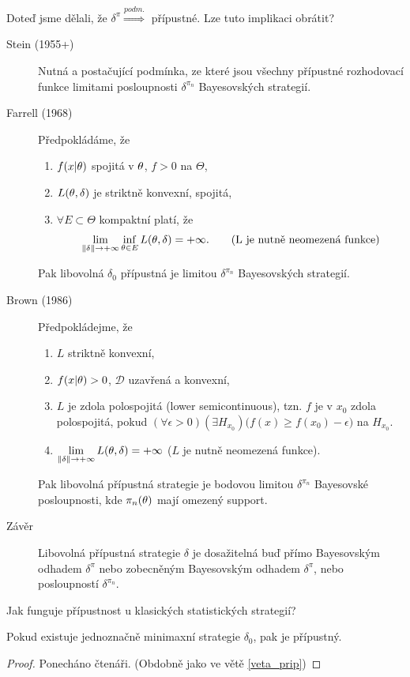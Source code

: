 \begin{remark}
	Doteď jsme dělali, že $\delta^{\pi}\overset{podm.}{\Rightarrow}$ přípustné. Lze tuto implikaci obrátit? 
	\begin{description}
		\item[Stein (1955+)] Nutná a postačující podmínka, ze které jsou všechny přípustné rozhodovací funkce limitami posloupnosti $\delta^{\pi_n}$ Bayesovských strategií.
		\item[Farrell (1968)] Předpokládáme, že \begin{enumerate}[1)]
			\item $f(x|\theta)$ spojitá v $\theta$, $f>0$ na $\Theta$,
			\item $L(\theta,\delta)$ je striktně konvexní, spojitá,
			\item $\forall E\subset\Theta$ kompaktní platí, že 
			$$ \lim\limits_{\left\|\delta\right\|\to+\infty}\inf\limits_{\theta\in E}L(\theta,\delta)=+\infty.\qquad(\text{L je nutně neomezená funkce})$$ 
		\end{enumerate}
	Pak libovolná $\delta_0$ přípustná je limitou $\delta^{\pi_n}$ Bayesovských strategií.
	\item[Brown (1986)] Předpokládejme, že \begin{enumerate}[1)]
		\item $L$ striktně konvexní,
		\item $f(x|\theta)>0$, $\mathscr{D}$ uzavřená a konvexní,
		\item $L$ je zdola polospojitá (lower semicontinuous), tzn. $f$ je v $x_0$ zdola polospojitá, pokud $(\forall\epsilon>0)(\exists H_{x_0})\big(f(x)\geq f(x_0)-\epsilon\big)$ na $H_{x_0}$.
		\item $\lim\limits_{\left\|\delta\right\|\to+\infty} L(\theta,\delta)=+\infty$ \hspace{0.2cm} ($L$ je nutně neomezená funkce).
	\end{enumerate}
Pak libovolná přípustná strategie je bodovou limitou $\delta^{\pi_n}$ Bayesovské posloupnosti, kde $\pi_n(\theta)$ mají omezený support.
\item[Závěr] Libovolná přípustná strategie $\delta$ je dosažitelná buď přímo Bayesovským odhadem $\delta^\pi$ nebo zobecněným Bayesovským odhadem $\delta^\pi$, nebo posloupností $\delta^{\pi_n}$.
	\end{description}
\end{remark}
Jak funguje přípustnost u klasických statistických strategií?
\begin{theorem}\label{veta_mini}
	Pokud existuje jednoznačně minimaxní strategie $\delta_0$, pak je přípustný.\begin{proof}
		Ponecháno čtenáři. (Obdobně jako ve větě \ref{veta_prip})
	\end{proof}
\end{theorem}

